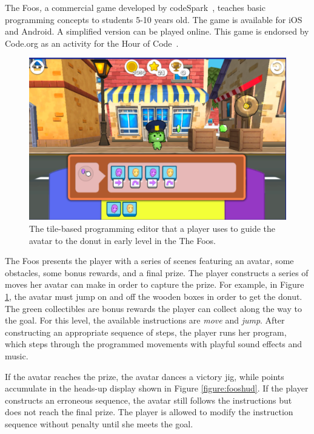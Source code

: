 \documentclass{sig-alternate-05-2015}
\begin{document}
The Foos{\em , }a commercial game developed by codeSpark~\cite{codespark}, teaches basic programming concepts to students 5-10 years old. The game is available for iOS and Android. A simplified version can be played online. This game is endorsed by Code.org as an activity for the Hour of Code~\cite{codeorg}.





\begin{figure}[tb]
\centering
\includegraphics[width=\linewidth]{images/image06.png}
\caption{The tile-based programming editor that a player uses to guide the avatar to the donut in early level in the The Foos.}
\label{figure:fooscode}
\end{figure}


The Foos presents the player with a series of scenes featuring an avatar, some obstacles, some bonus rewards, and a final prize. The player constructs a series of moves her avatar can make in order to capture the prize. For example, in Figure \ref{figure:fooscode}, the avatar must jump on and off the wooden boxes in order to get the donut. The green collectibles are bonus rewards the player can collect along the way to the goal. For this level, the available instructions are {\em move} and {\em jump}. After constructing an appropriate sequence of steps, the player runs her program, which steps through the programmed movements with playful sound effects and music. 



If the avatar reaches the prize, the avatar dances a victory jig, while points accumulate in the heads-up display shown in Figure \ref{figure:fooshud}. If the player constructs an erroneous sequence, the avatar still follows the instructions but does not reach the final prize. The player is allowed to modify the instruction sequence without penalty until she meets the goal.
\end{document}
